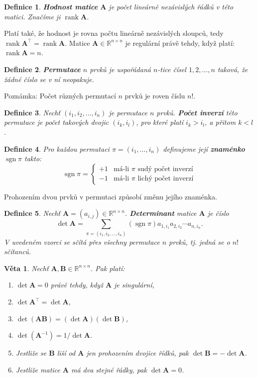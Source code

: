 \documentclass{article}
\newtheorem{df}{Definice}
\newtheorem{veta}{Věta}
\newcommand{\0}{\vec{0}}
\newcommand{\A}{\mat A}
\newcommand{\B}{\mat B}
\newcommand{\mat}[1]{\mathbf{#1}}
\newcommand{\R}{\mathbb R}
\newcommand{\rank}{\operatorname{rank}}
\newcommand{\sgn}{\operatorname{sgn}}
\begin{document}
\begin{df}
{\bf Hodnost matice} $\A$ je počet lineárně nezávislých řádků v této matici.
Značíme ji $\rank\A$.
\end{df}
Platí také, že hodnost je rovna počtu lineárně nezávislých sloupců, tedy $\rank\A^\top=\rank\A$.
Matice $\A\in\R^{n\times n}$ je regulární právě tehdy, když platí: $\rank\A=n$.


\begin{df}
{\bf Permutace} $n$ prvků je uspořádaná $n$-tice čísel $1,2,\ldots,n$ taková, že žádné číslo se v ní neopakuje.
\end{df}
Poznámka: Počet různých permutací $n$ prvků je roven číslu $n!$.

\begin{df}
Nechť $(i_1,i_2,\ldots,i_n)$ je permutace $n$ prvků.
{\bf Počet inverzí} této permutace je počet takových dvojic $(i_k,i_l)$, pro které platí $i_k>i_l$, a přitom $k<l$.
\end{df}

\begin{df}
Pro každou permutaci $\pi=(i_1,\ldots,i_n)$ definujeme její {\bf znaménko} $\sgn\pi$ takto:
$$ \sgn\pi = \begin{cases}+1 & \mbox{má-li $\pi$ sudý počet inverzí}\\-1 & \mbox{má-li $\pi$ lichý počet inverzí}\end{cases} $$
\end{df}
Prohozením dvou prvků v permutaci způsobí změnu jejího znaménka.

\begin{df}
Nechť $\A=(a_{i,j})\in\R^{n\times n}$. {\bf Determinant} matice $\A$ je číslo
$$ \det\A=\sum_{\pi=(i_1,i_2,\ldots,i_n)}(\sgn\pi) a_{1,i_1} a_{2,i_2} \cdots a_{n,i_n}. $$
V uvedeném vzorci se sčítá přes všechny permutace $n$ prvků, tj. jedná se o $n!$ sčítanců.
\end{df}


\begin{veta}
Nechť $\A,\B\in\R^{n\times n}$.
Pak platí:
\begin{enumerate}
\item $\det\A=0$ právě tehdy, když $\A$ je singulární,
\item $\det\A^\top=\det\A$,
\item $\det(\A\B)=(\det\A)(\det\B)$,
\item $\det(\A^{-1})=1/\det\A$.
\item Jestliže se $\B$ liší od $\A$ jen prohozením dvojice řídků, pak $\det\B=-\det\A$.
\item Jestliže matice $\A$ má dva stejné řádky, pak $\det\A=0$.
\end{enumerate}
\end{veta}
\end{document}
